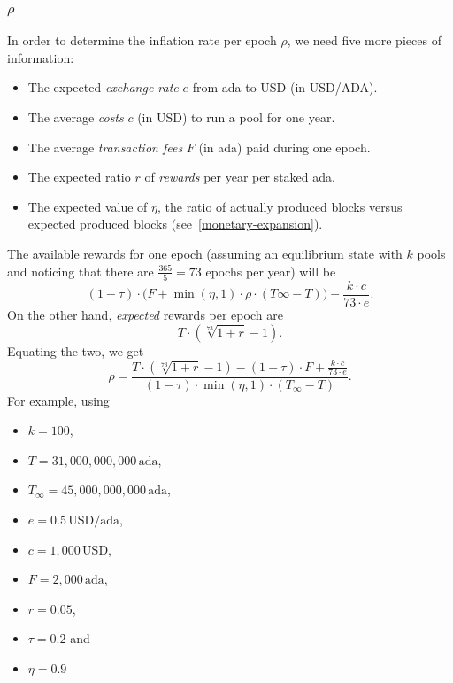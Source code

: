 \documentclass[11pt,a4paper,dvipsnames,twosided]{article}
\begin{document}
\subsubsection{\texorpdfstring{\(\rho\)}{\textbackslash{}rho}}

In order to determine the inflation rate per epoch \(\rho\), we need five
more pieces of information:

\begin{itemize}
\item
  The expected \emph{exchange rate} \(e\) from ada to USD (in USD/ADA).
\item
  The average \emph{costs} \(c\) (in USD) to run a pool for one year.
\item
  The average \emph{transaction fees} \(F\) (in ada) paid during one
  epoch.
\item
  The expected ratio \(r\) of \emph{rewards} per year per staked ada.
\item
  The expected value of $\eta$, the ratio of actually produced blocks
  versus expected produced blocks (see~\ref{monetary-expansion}).
\end{itemize}

The available rewards for one epoch (assuming an equilibrium state with
\(k\) pools and noticing that there are \(\frac{365}{5}=73\) epochs per
year) will be \[
    \left(1-\tau\right)\cdot\bigl(F + \min(\eta,1)\cdot\rho\cdot\left(T\infty - T\right)\bigr) - \frac{k\cdot c}{73\cdot e}.
\] On the other hand, \emph{expected} rewards per epoch are \[
    T\cdot\left(\sqrt[73]{1+r}-1\right).
\] Equating the two, we get \[
    \rho=\frac{T\cdot\left(\sqrt[73]{1+r}-1\right)-(1-\tau)\cdot F+\frac{k\cdot c}{73\cdot e}}
    {\left(1-\tau\right)\cdot\min(\eta,1)\cdot\left(T_\infty-T\right)}.
\] For example, using

\begin{itemize}
\item
  \(k=100\),
\item
  \(T=31,000,000,000\,\mathrm{ada}\),
\item
  \(T_\infty=45,000,000,000\,\mathrm{ada}\),
\item
  \(e=0.5\,\mathrm{USD/ada}\),
\item
  \(c=1,000\,\mathrm{USD}\),
\item
  \(F=2,000\,\mathrm{ada}\),
\item
  \(r=0.05\),
\item
  \(\tau=0.2\) and
\item
  \(\eta=0.9\)
\end{itemize}
\end{document}
